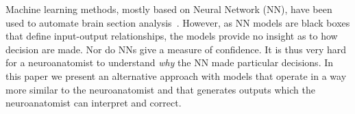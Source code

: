 \documentclass[11pt]{article}
\newcommand{\comment}[3]{{\color{#1} {\bf #2 :} #3}}
\newcommand{\yoav}[1]{\comment{purple}{Yoav}{#1}}
\begin{document}

Machine learning methods, mostly based on Neural Network (NN), have been used to automate brain section analysis~\cite{}. However, as NN models are black boxes that define input-output relationships, the models provide no insight as to how decision are made. Nor do NNs give a measure of confidence. It is thus very hard for a neuroanatomist to understand {\em why} the NN made particular decisions. In this paper we present an alternative approach with models that operate in a way more similar to the neuroanatomist and that generates outputs which the neuroanatomist can interpret and correct.
\end{document}
